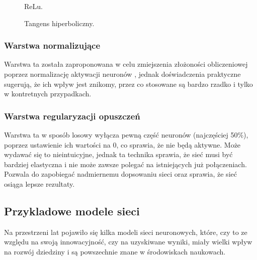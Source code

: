 \documentclass[a4paper,twoside,12pt]{book}
\begin{document}
{\begin{figure}[h!]
\begin{minipage}{.5\textwidth}
\caption{ReLu.}
\label{ReLu}
\end{minipage}%
\begin{minipage}{.5\textwidth}
\centering
{}
\caption{Tangens hiperboliczny.}
\label{tanh}
\end{minipage}%
\end{figure}


\subsubsection{Warstwa normalizujące}
{Warstwa ta została zaproponowana w celu zmiejszenia złożoności obliczeniowej poprzez normalizację aktywacji neuronów \cite{ba2016layer}, jednak doświadczenia praktyczne sugerują, że ich wpływ jest znikomy, przez co stosowane są bardzo rzadko i tylko w kontretnych przypadkach.}

\subsubsection{Warstwa regularyzacji opuszczeń}
{Warstwa ta w sposób losowy wyłącza pewną część neuronów (najczęściej 50\%), poprzez ustawienie ich wartości na 0, co sprawia, że nie będą aktywne. Może wydawać się to nieintuicyjne, jednak ta technika sprawia, że sieć musi być bardziej elastyczna i nie może zawsze polegać na istniejących już połączeniach. Pozwala do zapobiegać nadmiernemu dopsowaniu sieci oraz sprawia, że sieć osiąga lepsze rezultaty\cite{srivastava2014dropout}\cite{dahl2013improving}\cite{hinton2012improving}.}

\subsection{Przykladowe modele sieci}
{Na przestrzeni lat pojawiło się kilka modeli sieci neuronowych, które, czy to ze względu na swoją innowacyjność, czy na uzyskiwane wyniki, miały wielki wpływ na rozwój dziedziny i są powszechnie znane w środowiskach naukowach.}
}
\end{document}
